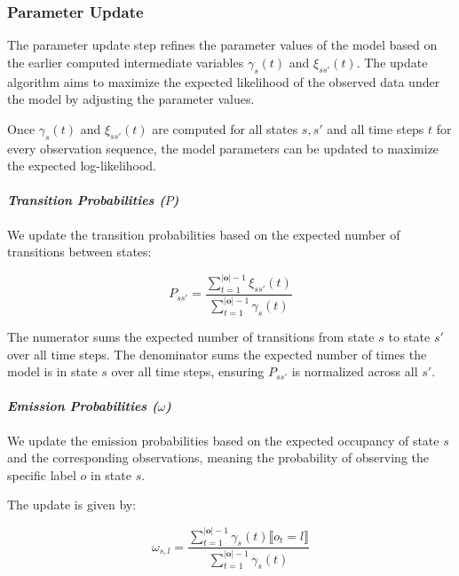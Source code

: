 \subsubsection{Parameter Update}
The parameter update step refines the parameter values of the model based on the earlier computed intermediate variables $\gamma_s(t)$ and $\xi_{ss'}(t)$.
The update algorithm aims to maximize the expected likelihood of the observed data under the model by adjusting the parameter values.

Once $\gamma_s(t)$ and $\xi_{ss'}(t)$ are computed for all states $s, s'$ and all time steps $t$ for every observation sequence, the model parameters can be updated to maximize the expected log-likelihood.

\paragraph*{\textit{Transition Probabilities ($P$)}}

We update the transition probabilities based on the expected number of transitions between states:


\begin{equation}
    P_{s s'} = \frac{\sum_{t = 1}^{|\mathbf{o}|-1} \xi_{ss'}(t)}{\sum_{t = 1}^{|\mathbf{o}|-1} \gamma_s(t)}
    \label{eq:transition-probabilities}
\end{equation}


The numerator sums the expected number of transitions from state $s$ to state $s'$ over all time steps.
The denominator sums the expected number of times the model is in state $s$ over all time steps, ensuring $P_{ss'}$ is normalized across all $s'$.

\paragraph*{\textit{Emission Probabilities ($\omega$)}}

We update the emission probabilities based on the expected occupancy of state $s$ and the corresponding observations, meaning the probability of observing the specific label $o$ in state $s$.

The update is given by:

\begin{equation}
    \omega_{s, l} = \frac{\sum_{t = 1}^{|\mathbf{o}|-1} \gamma_s(t) \lBrack o_t = l \rBrack}{\sum_{t = 1}^{|\mathbf{o}|-1} \gamma_s(t)}
    \label{eq:omega}
\end{equation}

